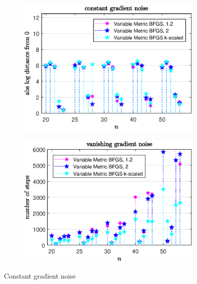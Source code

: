 \begin{figure}[H]
	\begin{subfigure}{0.49\textwidth}
		\includegraphics[width=\textwidth]{Pictures/Plots/constant_gradient_noise_compb.eps}%
	\end{subfigure}
	\begin{subfigure}{0.49\textwidth}
		\includegraphics[width=\textwidth]{Pictures/Plots/steps_constant_gradient_noise_compb.eps}%
	\end{subfigure}
	\caption{Constant gradient noise}%
	\label{fig_const_grad_noise_comp_large_large}%
\end{figure}

